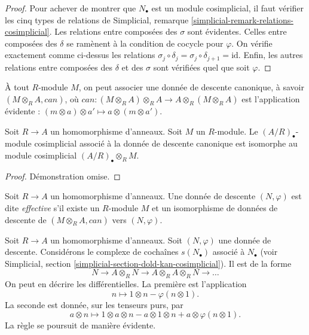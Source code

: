 \begin{proof}
\medskip\noindent
Pour achever de montrer que $N_\bullet$ est un module cosimplicial,
il faut vérifier les cinq types de relations de
Simplicial, remarque \ref{simplicial-remark-relations-cosimplicial}.
Les relations entre composées des $\sigma$ sont évidentes.
Celles entre composées des $\delta$ se ramènent à la condition
de cocycle pour $\varphi$.
On vérifie exactement comme ci-dessus les relations
$\sigma_j \circ \delta_j = \sigma_j \circ \delta_{j + 1} = \text{id}$.
Enfin, les autres relations entre composées des $\delta$ et des $\sigma$
sont vérifiées quel que soit $\varphi$.
\end{proof}

\noindent
À tout $R$-module $M$, on peut associer une donnée de descente canonique,
à savoir $(M \otimes_R A, can)$, où
$can : (M \otimes_R A) \otimes_R A \to A \otimes_R (M \otimes_R A)$
est l'application évidente :
$(m \otimes a) \otimes a' \mapsto a \otimes (m \otimes a')$.

\begin{lemma}
\label{lemma-canonical-descent-datum-cosimplicial}
Soit $R \to A$ un homomorphisme d'anneaux.
Soit $M$ un $R$-module. Le
$(A/R)_\bullet$-module cosimplicial associé à la donnée de descente canonique
est isomorphe au module cosimplicial $(A/R)_\bullet \otimes_R M$.
\end{lemma}

\begin{proof}
Démonstration omise.
\end{proof}

\begin{definition}
\label{definition-descent-datum-effective-module}
Soit $R \to A$ un homomorphisme d'anneaux.
Une donnée de descente $(N, \varphi)$ est dite {\it effective}
s'il existe un $R$-module $M$ et un isomorphisme de données de descente
de $(M \otimes_R A, can)$ vers
$(N, \varphi)$.
\end{definition}

\noindent
Soit $R \to A$ un homomorphisme d'anneaux.
Soit $(N, \varphi)$ une donnée de descente.
Considérons le complexe de cochaînes $s(N_\bullet)$ associé
à $N_\bullet$ (voir
Simplicial, section \ref{simplicial-section-dold-kan-cosimplicial}).
Il est de la forme
$$
N \to A \otimes_R N \to A \otimes_R A \otimes_R N \to \ldots
$$
On peut en décrire les différentielles.
La première est l'application
$$
n \longmapsto 1 \otimes n - \varphi(n \otimes 1).
$$
La seconde est donnée, sur les tenseurs purs, par
$$
a \otimes n \longmapsto 1 \otimes a \otimes n
- a \otimes 1 \otimes n + a \otimes \varphi(n \otimes 1).
$$
La règle se poursuit de manière évidente.

